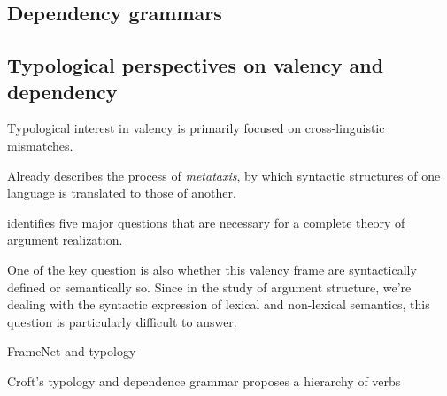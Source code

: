 \subsection{Dependency grammars}

\citet{demarneffe2019}




\subsection{Typological perspectives on valency and dependency}

Typological interest in valency is primarily focused on cross-linguistic mismatches.

Already \citet{tesniere1959} describes the process of \textit{metataxis}, by which syntactic structures of one language is translated to those of another.  

\citet{levin2005} identifies five major questions that are necessary for a complete theory of argument realization.


One of the key question is also whether this valency frame are syntactically defined or semantically so. Since in the study of argument structure, we're dealing with the syntactic expression of lexical and non-lexical semantics, this question is particularly difficult to answer.


\cite{baker2020, ellsworth2021} FrameNet and typology

\cite{croft2017} Croft's typology and dependence grammar
\citet{tsunoda1981, tsunoda1985} proposes a hierarchy of verbs


